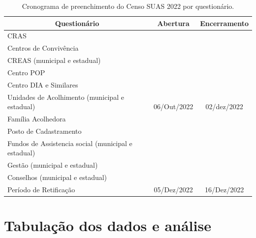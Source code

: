 \documentclass[
  brazilian]{report}
\begin{document}
\begin{table}[h]
\centering
\caption{Cronograma de preenchimento do Censo SUAS 2022 por questionário.}
\label{tab:cronograma}
\begin{tabular}{|l|c|c|}
\hline
\multicolumn{1}{|c|}{Questionário} & Abertura                      & Encerramento                  \\ \hline
CRAS                               & \multirow{11}{*}{06/Out/2022} & \multirow{11}{*}{02/dez/2022} \\ \cline{1-1}
Centros de Convivência             &                               &                               \\ \cline{1-1}
CREAS (municipal e estadual)       &                               &                               \\ \cline{1-1}
Centro POP                         &                               &                               \\ \cline{1-1}
Centro DIA e Similares             &                               &                               \\ \cline{1-1}
Unidades de Acolhimento 
(municipal e estadual)             &                               &                               \\ \cline{1-1}
Família Acolhedora                 &                               &                               \\ \cline{1-1}
Posto de Cadastramento             &                               &                               \\ \cline{1-1}
Fundos de Assistencia social 
(municipal e estadual)             &                               &                               \\ \cline{1-1}
Gestão (municipal e estadual)      &                               &                               \\ \cline{1-1}
Conselhos (municipal e estadual)   &                               &                               \\ \hline
\hline
Período de Retificação             & 05/Dez/2022                   & 16/Dez/2022                   \\ \hline
\end{tabular}
\end{table}

\hypertarget{tabulauxe7uxe3o-dos-dados-e-anuxe1lise}{%
\section{Tabulação dos dados e
análise}\label{tabulauxe7uxe3o-dos-dados-e-anuxe1lise}}
\end{document}
